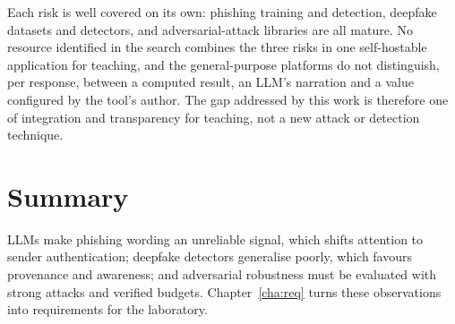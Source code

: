 Each risk is well covered on its own: phishing training and detection, deepfake datasets and detectors, and adversarial-attack libraries are all mature. No resource identified in the search combines the three risks in one self-hostable application for teaching, and the general-purpose platforms do not distinguish, per response, between a computed result, an LLM's narration and a value configured by the tool's author. The gap addressed by this work is therefore one of integration and transparency for teaching, not a new attack or detection technique.

\section{Summary}
\label{sec:sota-summary}

LLMs make phishing wording an unreliable signal, which shifts attention to sender authentication; deepfake detectors generalise poorly, which favours provenance and awareness; and adversarial robustness must be evaluated with strong attacks and verified budgets. Chapter~\ref{cha:req} turns these observations into requirements for the laboratory.
